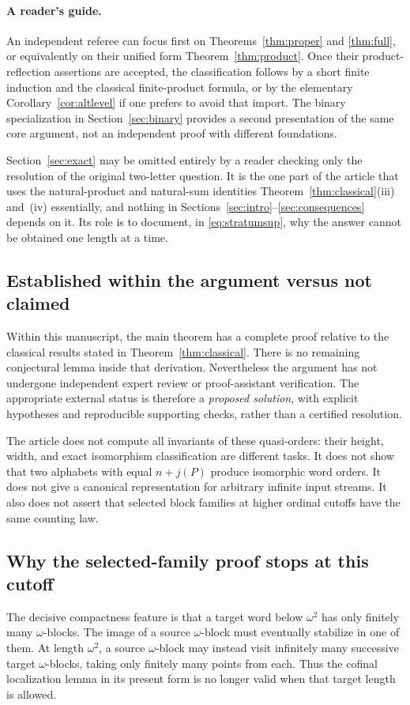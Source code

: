 \documentclass[11pt,a4paper]{article}
\numberwithin{equation}{section}
\theoremstyle{definition}
\theoremstyle{remark}
\begin{document}
\paragraph{A reader's guide.}
An independent referee can focus first on Theorems~\ref{thm:proper} and
\ref{thm:full}, or equivalently on their unified form
Theorem~\ref{thm:product}. Once their product-reflection assertions are
accepted, the classification follows by a short finite induction and the
classical finite-product formula, or by the elementary
Corollary~\ref{cor:altlevel} if one prefers to avoid that import. The binary
specialization in Section~\ref{sec:binary} provides a second presentation of
the same core argument, not an independent proof with different foundations.

Section~\ref{sec:exact} may be omitted entirely by a reader checking only the
resolution of the original two-letter question. It is the one part of the
article that uses the natural-product and natural-sum identities
Theorem~\ref{thm:classical}(iii) and~(iv) essentially, and nothing in
Sections~\ref{sec:intro}--\ref{sec:consequences} depends on it. Its role is to
document, in \eqref{eq:stratumsup}, why the answer cannot be obtained one
length at a time.

\subsection{Established within the argument versus not claimed}
Within this manuscript, the main theorem has a complete proof relative to
the classical results stated in Theorem~\ref{thm:classical}. There is no
remaining conjectural lemma inside that derivation. Nevertheless the
argument has not undergone independent expert review or proof-assistant
verification. The appropriate external status is therefore a
\emph{proposed solution}, with explicit hypotheses and reproducible
supporting checks, rather than a certified resolution.

The article does not compute all invariants of these quasi-orders: their
height, width, and exact isomorphism classification are different tasks.
It does not show that two alphabets with equal $n+j(P)$ produce isomorphic
word orders. It does not give a canonical representation for arbitrary
infinite input streams. It also does not assert that selected block
families at higher ordinal cutoffs have the same counting law.

\subsection{Why the selected-family proof stops at this cutoff}
The decisive compactness feature is that a target word below $\omega^2$
has only finitely many $\omega$-blocks. The image of a source $\omega$-block
must eventually stabilize in one of them. At length $\omega^2$, a source
$\omega$-block may instead visit infinitely many successive target
$\omega$-blocks, taking only finitely many points from each. Thus the
cofinal localization lemma in its present form is no longer valid when
that target length is allowed.
\end{document}
